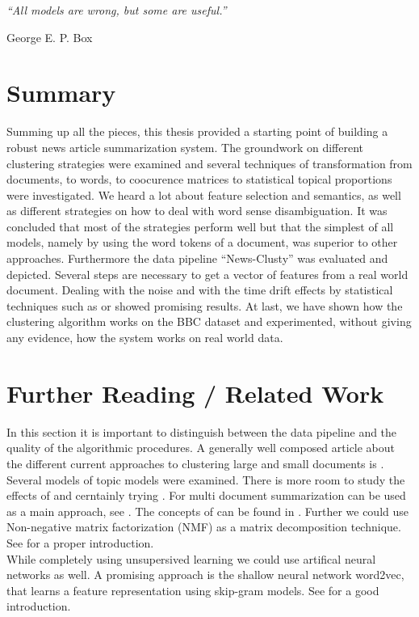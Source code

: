 \epigraph{\emph{
  ``All models are wrong, but some are useful.''
}}{ George E. P. Box }

\section{Summary}
Summing up all the pieces, this thesis provided a starting point of building a robust  news article summarization system. The groundwork on different clustering strategies were examined and several techniques of transformation from documents, to words, to coocurence matrices to statistical topical proportions were investigated. We heard a lot about feature selection and semantics, as well as different strategies on how to deal with word sense disambiguation. It was concluded that most of the strategies perform well but that the simplest of all models, namely by using the word tokens of a document, was superior to other approaches. Furthermore the data pipeline ``News-Clusty'' was evaluated and depicted. Several steps are necessary to get a vector of features from a real world document. Dealing with the noise and with the time drift effects by statistical techniques such as \lsa{} or \lda{} showed promising results. At last, we have shown how the clustering algorithm works on the BBC dataset and experimented, without giving any evidence, how the system works on real world data.

\section{Further Reading / Related Work}

In this section it is important to distinguish between the data pipeline and the quality of the algorithmic procedures. A generally well composed article about the different current approaches to clustering large and small documents is \cite{NextFrontierClustering2013}.\\

Several models of topic models were examined. There is more room to study the effects of \lda{} and cerntainly trying \hdp{}. For multi document summarization \lda{} can be used as a main approach, see \cite{MultiDocSumLDA2008}. The concepts of \hdpfull{} can be found in \cite{NonParametricBayes2007, HDP2006}. Further we could use Non-negative matrix factorization (NMF) as a matrix decomposition technique. See \cite{NMF1999} for a proper introduction.\\

While completely using unsupersived learning we could use artifical neural networks as well. A promising approach is the shallow neural network word2vec, that learns a feature representation using skip-gram models. See \cite{Word2Vec2014} for a good introduction.\\

